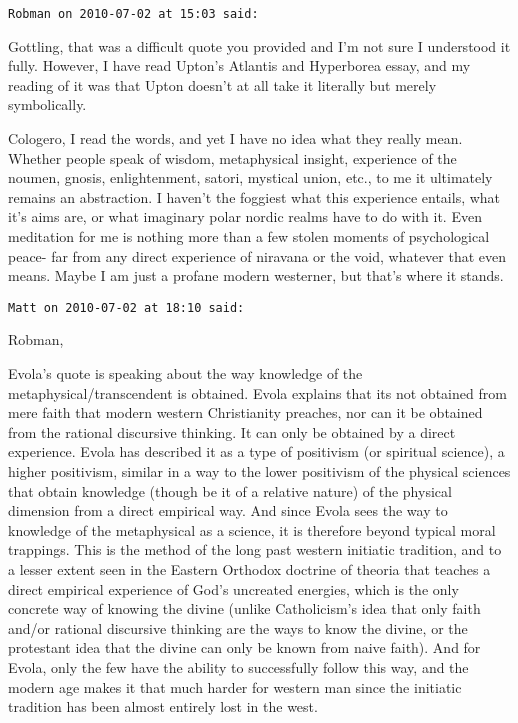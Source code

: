 \begin{footnotesize}
\begin{sffamily}
\hfill

\texttt{Robman on 2010-07-02 at 15:03 said: }

Gottling, that was a difficult quote you provided and I'm not sure I understood it fully. However, I have read Upton's Atlantis and Hyperborea essay, and my reading of it was that Upton doesn't at all take it literally but merely symbolically.

Cologero, I read the words, and yet I have no idea what they really mean. Whether people speak of wisdom, metaphysical insight, experience of the noumen, gnosis, enlightenment, satori, mystical union, etc., to me it ultimately remains an abstraction. I haven't the foggiest what this experience entails, what it's aims are, or what imaginary polar nordic realms have to do with it. Even meditation for me is nothing more than a few stolen moments of psychological peace- far from any direct experience of niravana or the void, whatever that even means. Maybe I am just a profane modern westerner, but that's where it stands.


\hfill

\texttt{Matt on 2010-07-02 at 18:10 said: }

Robman,

Evola's quote is speaking about the way knowledge of the metaphysical/transcendent is obtained. Evola explains that its not obtained from mere faith that modern western Christianity preaches, nor can it be obtained from the rational discursive thinking. It can only be obtained by a direct experience. Evola has described it as a type of positivism (or spiritual science), a higher positivism, similar in a way to the lower positivism of the physical sciences that obtain knowledge (though be it of a relative nature) of the physical dimension from a direct empirical way. And since Evola sees the way to knowledge of the metaphysical as a science, it is therefore beyond typical moral trappings. This is the method of the long past western initiatic tradition, and to a lesser extent seen in the Eastern Orthodox doctrine of theoria that teaches a direct empirical experience of God's uncreated energies, which is the only concrete way of knowing the divine (unlike Catholicism's idea that only faith and/or rational discursive thinking are the ways to know the divine, or the protestant idea that the divine can only be known from naive faith). And for Evola, only the few have the ability to successfully follow this way, and the modern age makes it that much harder for western man since the initiatic tradition has been almost entirely lost in the west.


\end{sffamily}
\end{footnotesize}
